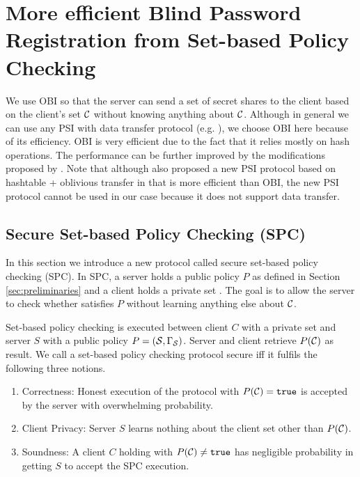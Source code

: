 \section{More efficient Blind Password Registration from Set-based Policy Checking}\label{sec:spc-bpr}

We use \ac{OBI} so that the server can send a set of secret shares to the client based on the client's set $\mathcal{C}$ without knowing anything about $\mathcal{C}$. 
Although in general we can use any \ac{PSI} with data transfer protocol (e.g. \citet{fre04}), we choose \ac{OBI} here because of its efficiency. 
\ac{OBI} is very efficient due to the fact that it relies mostly on hash operations. 
The performance can be further improved by the modifications proposed by \citet{Pinkas0Z14}. 
Note that although \citet{Pinkas0Z14} also proposed a new \ac{PSI} protocol based on hashtable + oblivious transfer in \cite{Pinkas0Z14} that is more efficient than \ac{OBI}, the new \ac{PSI} protocol cannot be used in our case because it does not support data transfer.

\subsection{Secure Set-based Policy Checking (SPC)} \label{sec:spc}
In this section we introduce a new protocol called secure set-based policy checking (SPC). In SPC, a server holds a public policy $P$ as defined in Section \ref{sec:preliminaries} and a client holds a private set \cC. The goal is to allow the server to check whether \cC satisfies $P$ without learning anything else about $\mathcal{C}$. 

\begin{definition}\label{def:SPC}
Set-based policy checking is executed between client $C$ with a private set \cC and server $S$ with a public policy $P=(\mathcal{S},\Gamma_\mathcal{S})$.
Server and client retrieve $P(\mathcal{C})$ as result. 
We call a set-based policy checking protocol secure iff it fulfils the following three notions.
\begin{enumerate}
  \item Correctness: Honest execution of the protocol with $P(\mathcal{C})=\mathtt{true}$ is accepted by the server with overwhelming probability.
  \item Client Privacy: Server $S$ learns nothing about the client set \cC other than $P(\mathcal{C})$.
  \item Soundness: A client $C$ holding \cC with $P(\mathcal{C})\not=\mathtt{true}$ has negligible probability in getting $S$ to accept the SPC execution.
\end{enumerate}
\eod
\end{definition}

